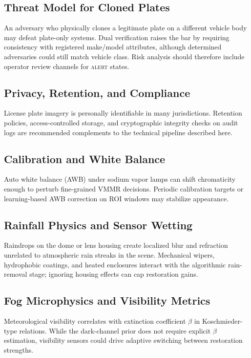\subsection{Threat Model for Cloned Plates}
An adversary who physically clones a legitimate plate on a different vehicle body may defeat plate-only systems. Dual verification raises the bar by requiring consistency with registered make/model attributes, although determined adversaries could still match vehicle class. Risk analysis should therefore include operator review channels for \textsc{alert} states.

\subsection{Privacy, Retention, and Compliance}
License plate imagery is personally identifiable in many jurisdictions. Retention policies, access-controlled storage, and cryptographic integrity checks on audit logs are recommended complements to the technical pipeline described here.

\subsection{Calibration and White Balance}
Auto white balance (AWB) under sodium vapor lamps can shift chromaticity enough to perturb fine-grained VMMR decisions. Periodic calibration targets or learning-based AWB correction on ROI windows may stabilize appearance.

\subsection{Rainfall Physics and Sensor Wetting}
Raindrops on the dome or lens housing create localized blur and refraction unrelated to atmospheric rain streaks in the scene. Mechanical wipers, hydrophobic coatings, and heated enclosures interact with the algorithmic rain-removal stage; ignoring housing effects can cap restoration gains.

\subsection{Fog Microphysics and Visibility Metrics}
Meteorological visibility correlates with extinction coefficient $\beta$ in Koschmieder-type relations. While the dark-channel prior does not require explicit $\beta$ estimation, visibility sensors could drive adaptive switching between restoration strengths.

